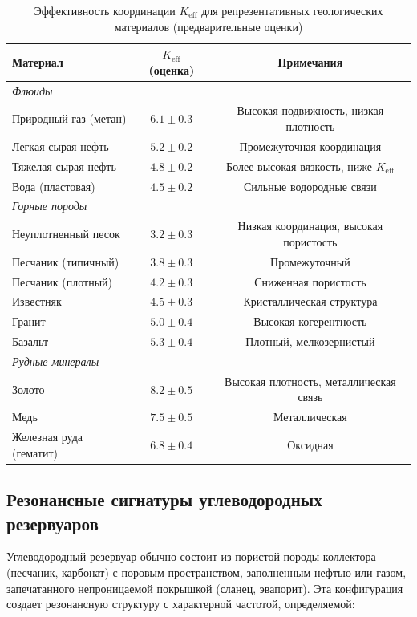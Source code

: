 \documentclass[12pt,a4paper]{article}
\theoremstyle{remark}
\newcommand{\Keff}{K_{\mathrm{eff}}}
\begin{document}
	\begin{table}[htbp]
		\centering
		\caption{Эффективность координации \(\Keff\) для репрезентативных геологических материалов (предварительные оценки)}
		\label{tab:keff-geology}
		\small
		\begin{tabular}{lcc}
			\toprule
			\textbf{Материал} & \textbf{\(\Keff\) (оценка)} & \textbf{Примечания} \\
			\midrule
			\multicolumn{3}{l}{\textit{Флюиды}} \\
			Природный газ (метан) & $6.1 \pm 0.3$ & Высокая подвижность, низкая плотность \\
			Легкая сырая нефть & $5.2 \pm 0.2$ & Промежуточная координация \\
			Тяжелая сырая нефть & $4.8 \pm 0.2$ & Более высокая вязкость, ниже \(\Keff\) \\
			Вода (пластовая) & $4.5 \pm 0.2$ & Сильные водородные связи \\
			\hline
			\multicolumn{3}{l}{\textit{Горные породы}} \\
			Неуплотненный песок & $3.2 \pm 0.3$ & Низкая координация, высокая пористость \\
			Песчаник (типичный) & $3.8 \pm 0.3$ & Промежуточный \\
			Песчаник (плотный) & $4.2 \pm 0.3$ & Сниженная пористость \\
			Известняк & $4.5 \pm 0.3$ & Кристаллическая структура \\
			Гранит & $5.0 \pm 0.4$ & Высокая когерентность \\
			Базальт & $5.3 \pm 0.4$ & Плотный, мелкозернистый \\
			\hline
			\multicolumn{3}{l}{\textit{Рудные минералы}} \\
			Золото & $8.2 \pm 0.5$ & Высокая плотность, металлическая связь \\
			Медь & $7.5 \pm 0.5$ & Металлическая \\
			Железная руда (гематит) & $6.8 \pm 0.4$ & Оксидная \\
			\bottomrule
		\end{tabular}
	\end{table}
	
	\subsection{Резонансные сигнатуры углеводородных резервуаров}
	
	Углеводородный резервуар обычно состоит из пористой породы-коллектора (песчаник, карбонат) с поровым пространством, заполненным нефтью или газом, запечатанного непроницаемой покрышкой (сланец, эвапорит). Эта конфигурация создает резонансную структуру с характерной частотой, определяемой:
	
\end{document}
